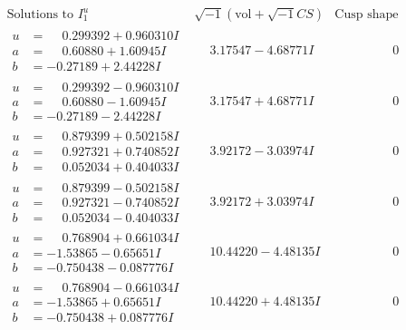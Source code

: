 \documentclass[1p]{elsarticle_modified}
\theoremstyle{definition}
\newcommand{\I}{\sqrt{-1}}
\begin{document}
$$\begin{array}{c|c|c}  
\text{Solutions to }I^u_{1}& \I (\text{vol} + \sqrt{-1}CS) & \text{Cusp shape}\\
 \hline 
\begin{aligned}
u &= \phantom{-}0.299392 + 0.960310 I \\
a &= \phantom{-}0.60880 + 1.60945 I \\
b &= -0.27189 + 2.44228 I\end{aligned}
 & \phantom{-}3.17547 - 4.68771 I & \phantom{-0.000000 } 0 \\ \hline\begin{aligned}
u &= \phantom{-}0.299392 - 0.960310 I \\
a &= \phantom{-}0.60880 - 1.60945 I \\
b &= -0.27189 - 2.44228 I\end{aligned}
 & \phantom{-}3.17547 + 4.68771 I & \phantom{-0.000000 } 0 \\ \hline\begin{aligned}
u &= \phantom{-}0.879399 + 0.502158 I \\
a &= \phantom{-}0.927321 + 0.740852 I \\
b &= \phantom{-}0.052034 + 0.404033 I\end{aligned}
 & \phantom{-}3.92172 - 3.03974 I & \phantom{-0.000000 } 0 \\ \hline\begin{aligned}
u &= \phantom{-}0.879399 - 0.502158 I \\
a &= \phantom{-}0.927321 - 0.740852 I \\
b &= \phantom{-}0.052034 - 0.404033 I\end{aligned}
 & \phantom{-}3.92172 + 3.03974 I & \phantom{-0.000000 } 0 \\ \hline\begin{aligned}
u &= \phantom{-}0.768904 + 0.661034 I \\
a &= -1.53865 - 0.65651 I \\
b &= -0.750438 - 0.087776 I\end{aligned}
 & \phantom{-}10.44220 - 4.48135 I & \phantom{-0.000000 } 0 \\ \hline\begin{aligned}
u &= \phantom{-}0.768904 - 0.661034 I \\
a &= -1.53865 + 0.65651 I \\
b &= -0.750438 + 0.087776 I\end{aligned}
 & \phantom{-}10.44220 + 4.48135 I & \phantom{-0.000000 } 0 \\ \hline\begin{aligned}

\end{aligned}
\end{array}$$
\end{document}
